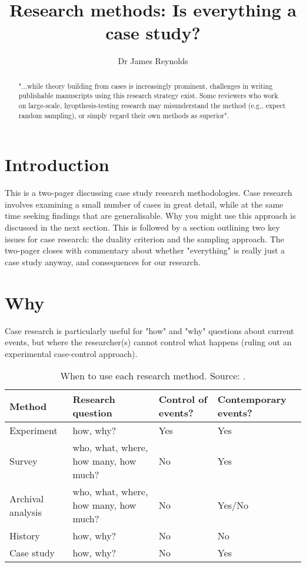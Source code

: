 \documentclass{tufte-handout}
\title{Research methods: Is everything a case study?}
\author{Dr James Reynolds}
\begin{document}
\maketitle%

\begin{abstract}
\noindent
"...while theory building from cases is increasingly prominent, challenges in writing publishable manuscripts using this research strategy exist.  Some reviewers who work on large-scale, hyopthesis-testing research may misunderstand the method (e.g., expect random sampling), or simply regard their own methods as superior"\cite{Eisenhardt2007TBfC}.
\end{abstract}


\section{Introduction}
This is a two-pager 
discussing case study research methodologies. 
Case research involves 
examining a small number of cases 
in great detail, 
while at the same time 
seeking findings that are generalisable\cite{Yin2009aa, Barrat2011aa, Ketokivi2014aa,}. 
Why you might use this approach 
 is discussed in the next section. 
 This is followed by 
 a section outlining 
 two key issues for case research: 
 the duality criterion 
 and the sampling approach. 
 The two-pager closes with 
 commentary about 
 whether "everything" is really just a case study anyway, 
 and consequences for our research.

\section{Why} 
Case research is particularly useful for "how" and "why" questions 
about current events, 
but where the researcher(s) cannot 
control what happens (ruling out an experimental case-control approach). 

\begin{table*}[ht]
  \centering
  \selectfont
  \begin{tabular}{llll}
    \toprule
    Method & Research question & Control of events? & Contemporary events? \\
    \midrule
    Experiment & how, why? & Yes & Yes \\
    Survey & who, what, where, how many, how much? & No & Yes \\
    Archival analysis & who, what, where, how many, how much? & No & Yes/No \\
    History & how, why? & No & No \\
    Case study & how, why? & No & Yes \\
    \bottomrule
  \end{tabular}
  \caption{When to use each research method. Source: \citet{Yin2009aa}.}
  \label{tab:when_where}
\end{table*}
\end{document}
